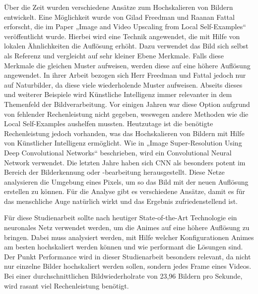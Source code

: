 \begin{onehalfspace}
Über die Zeit wurden verschiedene Ansätze zum Hochskalieren von Bildern entwickelt. Eine Möglichkeit wurde von Gilad Freedman und Raanan Fattal erforscht, die im Paper „Image and Video Upscaling from Local Self-Examples“ veröffentlicht wurde. Hierbei wird eine Technik angewendet, die mit Hilfe von lokalen Ähnlichkeiten die Auflösung erhöht. Dazu verwendet das Bild sich selbst als Referenz und vergleicht auf sehr kleiner Ebene Merkmale. Falls diese Merkmale die gleichen Muster aufweisen, werden diese auf eine höhere Auflösung angewendet. In ihrer Arbeit bezogen sich Herr Freedman und Fattal jedoch nur auf Naturbilder, da diese viele wiederholende Muster aufweisen. Abseits dieses und weiterer Beispiele wird Künstliche Intelligenz immer relevanter in dem Themenfeld der Bildverarbeitung. Vor einigen Jahren war diese Option aufgrund von fehlender Rechenleistung nicht gegeben, weswegen andere Methoden wie die Local Self-Examples aushelfen mussten. Heutzutage ist die benötigte Rechenleistung jedoch vorhanden, was das Hochskalieren von Bildern mit Hilfe von Künstlicher Intelligenz ermöglicht. Wie in „Image Super-Resolution Using Deep Convolutional Networks“ beschrieben, wird ein Convolutional Neural Network verwendet. Die letzten Jahre haben sich CNN als besonders potent im Bereich der Bilderkennung oder -bearbeitung herausgestellt. Diese Netze analysieren die Umgebung eines Pixels, um so das Bild mit der neuen Auflösung erstellen zu können. Für die Analyse gibt es verschiedene Ansätze, damit es für das menschliche Auge natürlich wirkt und das Ergebnis zufriedenstellend ist.

Für diese Studienarbeit sollte nach heutiger State-of-the-Art Technologie ein neuronales Netz verwendet werden, um die Animes auf eine höhere Auflösung zu bringen. Dabei muss analysiert werden, mit Hilfe welcher Konfigurationen Animes am besten hochskaliert werden können und wie performant die Lösungen sind. Der Punkt Performance wird in dieser Studienarbeit besonders relevant, da nicht nur einzelne Bilder hochskaliert werden sollen, sondern jedes Frame eines Videos. Bei einer durchschnittlichen Bildwiederholrate von 23,96 Bildern pro Sekunde, wird rasant viel Rechenleistung benötigt.



\end{onehalfspace}